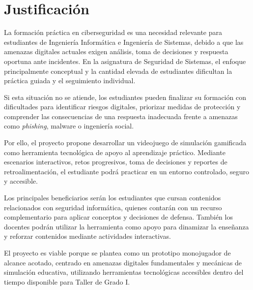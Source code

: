 \section{Justificación}

La formación práctica en ciberseguridad es una necesidad relevante para estudiantes de Ingeniería Informática e Ingeniería de Sistemas, debido a que las amenazas digitales actuales exigen análisis, toma de decisiones y respuesta oportuna ante incidentes. En la asignatura de Seguridad de Sistemas, el enfoque principalmente conceptual y la cantidad elevada de estudiantes dificultan la práctica guiada y el seguimiento individual.

Si esta situación no se atiende, los estudiantes pueden finalizar su formación con dificultades para identificar riesgos digitales, priorizar medidas de protección y comprender las consecuencias de una respuesta inadecuada frente a amenazas como \textit{phishing}, malware o ingeniería social.

Por ello, el proyecto propone desarrollar un videojuego de simulación gamificada como herramienta tecnológica de apoyo al aprendizaje práctico. Mediante escenarios interactivos, retos progresivos, toma de decisiones y reportes de retroalimentación, el estudiante podrá practicar en un entorno controlado, seguro y accesible.

Los principales beneficiarios serán los estudiantes que cursan contenidos relacionados con seguridad informática, quienes contarán con un recurso complementario para aplicar conceptos y decisiones de defensa. También los docentes podrán utilizar la herramienta como apoyo para dinamizar la enseñanza y reforzar contenidos mediante actividades interactivas.

El proyecto es viable porque se plantea como un prototipo monojugador de alcance acotado, centrado en amenazas digitales fundamentales y mecánicas de simulación educativa, utilizando herramientas tecnológicas accesibles dentro del tiempo disponible para Taller de Grado I.
